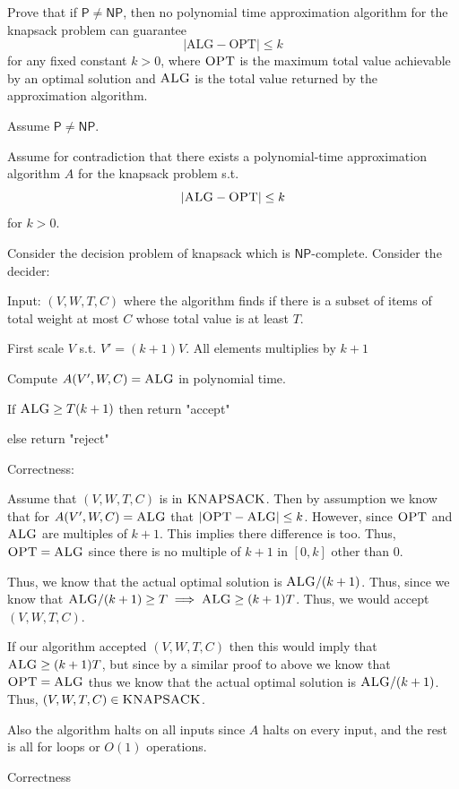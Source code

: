 \documentclass[12pt, letterpaper]{article}
\renewcommand{\P}{\mathsf{P}}
\newcommand{\NP}{\mathsf{NP}}
\begin{document}
\begin{subproblem}{}
    Prove that if $\P \neq \NP$, then no polynomial time approximation algorithm for the knapsack problem can guarantee
    \[
        |\text{ALG} - \text{OPT}| \leq k
    \]
    for any fixed constant $k > 0$, where $\textsc{OPT}$ is the maximum total value achievable by an optimal solution and $\textsc{ALG}$ is the total value returned by the approximation algorithm.
\end{subproblem}
\begin{problemproof}
    Assume $\P \neq \NP$.

    Assume for contradiction that there exists a polynomial-time approximation algorithm $A$ for the knapsack problem s.t.
    \[|\textsc{ALG} - \textsc{OPT} | \leq k\]
    for $k > 0$.

    Consider the decision problem of knapsack which is $\NP$-complete. Consider the decider:

    Input: $(V,W,T,C)$ where the algorithm finds if there is a subset of items of total weight at most $C$ whose total value is at least $T$.
    
    First scale $V$ s.t. $V'=(k+1)V$. All elements multiplies by $k+1$

    Compute $A(V',W,C)=\textsc{ALG}$ in polynomial time.

    If $\textsc{ALG} \geq T(k+1)$ then return "accept"

    else return "reject"


    Correctness:

    Assume that $(V,W,T,C)$ is in $\textsc{KNAPSACK}$. Then by assumption we know that for $A(V',W,C)=\textsc{ALG}$ that $|\textsc{OPT} - \textsc{ALG}| \leq k$. However, since $\textsc{OPT}$ and $\textsc{ALG}$ are multiples of $k+1$. This implies there difference is too. Thus, $\textsc{OPT}=\textsc{ALG}$ since there is no multiple of $k+1$ in $[0,k]$ other than 0.

    Thus, we know that the actual optimal solution is $\textsc{ALG}/(k+1)$. Thus, since we know that $\textsc{ALG}/(k+1) \geq T \implies \textsc{ALG} \geq (k+1)T$. Thus, we would accept $(V,W,T,C)$.

    If our algorithm accepted $(V,W,T,C)$ then this would imply that $\textsc{ALG} \geq (k+1)T$, but since by a similar proof to above we know that $\textsc{OPT}=\textsc{ALG}$ thus we know that the actual optimal solution is $\textsc{ALG} / (k+1)$. Thus, $(V,W,T,C) \in \textsc{KNAPSACK}$.

    Also the algorithm halts on all inputs since $A$ halts on every input, and the rest is all for loops or $O(1)$ operations.


Correctness


\end{problemproof}
\end{document}

